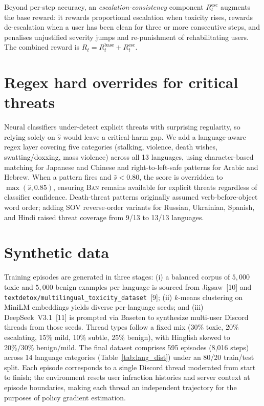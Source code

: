 \documentclass{article}
\begin{document}
Beyond per-step accuracy, an \textit{escalation-consistency} component
$R^{\text{esc}}_t$ augments the base reward: it rewards proportional escalation
when toxicity rises, rewards de-escalation when a user has been clean for three
or more consecutive steps, and penalises unjustified severity jumps and
re-punishment of rehabilitating users. The combined reward is
$R_t = R^{\text{base}}_t + R^{\text{esc}}_t$.


\section{Regex hard overrides for critical threats}
\label{sec:threats}

Neural classifiers under-detect explicit threats with surprising regularity, so
relying solely on $\hat{s}$ would leave a critical-harm gap. We add a
language-aware regex layer covering five categories (stalking, violence, death
wishes, swatting/doxxing, mass violence) across all 13 languages, using
character-based matching for Japanese and Chinese and right-to-left-safe
patterns for Arabic and Hebrew. When a pattern fires and $\hat{s} < 0.80$, the
score is overridden to $\max(\hat{s}, 0.85)$, ensuring \textsc{Ban} remains
available for explicit threats regardless of classifier confidence.
Death-threat patterns originally assumed verb-before-object word order; adding
SOV reverse-order variants for Russian, Ukrainian, Spanish, and Hindi raised
threat coverage from 9/13 to 13/13 languages.


\section{Synthetic data}

Training episodes are generated in three stages: (i) a balanced corpus of
$5{,}000$ toxic and $5{,}000$ benign examples per language is sourced from
Jigsaw~[10] and \texttt{textdetox/multilingual\_toxicity\_dataset}~[9];
(ii) $k$-means clustering on MiniLM embeddings yields diverse per-language
seeds; and (iii) DeepSeek~V3.1~[11] is prompted via Baseten to synthesize
multi-user Discord threads from those seeds. Thread types follow a fixed mix
(30\% toxic, 20\% escalating, 15\% mild, 10\% subtle, 25\% benign), with
Hinglish skewed to 20\%/30\% benign/mild. The final dataset comprises 595
episodes (8,016 steps) across 14 language categories
(Table~\ref{tab:lang_dist}) under an 80/20 train/test split. Each episode
corresponds to a single Discord thread moderated from start to finish; the
environment resets user infraction histories and server context at episode
boundaries, making each thread an independent trajectory for the purposes of
policy gradient estimation.
\end{document}
